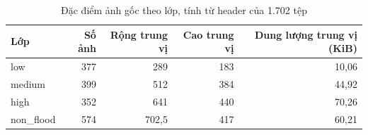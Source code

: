\begin{table}[htbp]\centering\small
\caption{Đặc điểm ảnh gốc theo lớp, tính từ header của 1.702 tệp}\label{tab:image-profile}
\begin{tabular}{lrrrr}
\toprule Lớp & Số ảnh & Rộng trung vị & Cao trung vị & Dung lượng trung vị (KiB) \\
\midrule
low & 377 & 289 & 183 & 10,06 \\
medium & 399 & 512 & 384 & 44,92 \\
high & 352 & 641 & 440 & 70,26 \\
non\_flood & 574 & 702,5 & 417 & 60,21 \\
\bottomrule\end{tabular}
\end{table}
